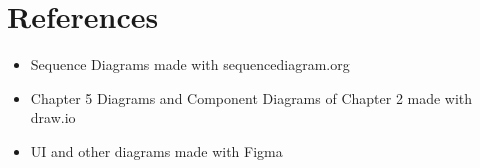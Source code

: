 \chapter{References}

\begin{itemize}
    \item Sequence Diagrams made with sequencediagram.org
    \item Chapter 5 Diagrams and Component Diagrams of Chapter 2 made with draw.io
    \item UI and other diagrams made with Figma
\end{itemize}